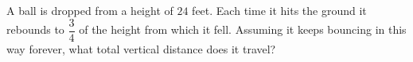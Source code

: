 A ball is dropped from a height of $24$ feet. Each time it hits the ground it rebounds to $\dfrac{3}{4}$ of the height from which it fell. Assuming it keeps bouncing in this way forever, what total vertical distance does it travel?
